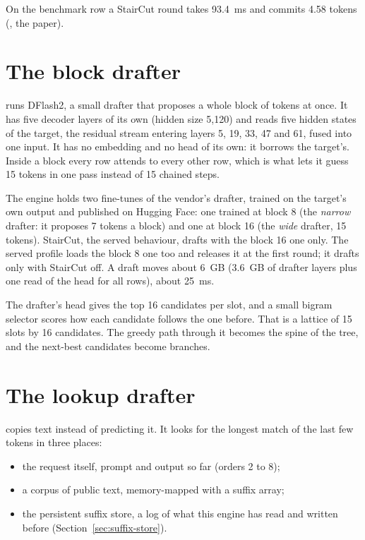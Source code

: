 On the benchmark row a StairCut round takes 93.4~ms and commits 4.58 tokens (\measured, the paper).

\section{The block drafter}

 runs DFlash2, a small drafter that proposes a whole block of tokens at once. It has five decoder layers of its own (hidden size 5,120) and reads five hidden states of the target, the residual stream entering layers 5, 19, 33, 47 and 61, fused into one input. It has no embedding and no head of its own: it borrows the target's. Inside a block every row attends to every other row, which is what lets it guess 15 tokens in one pass instead of 15 chained steps.

The engine holds two fine-tunes of the vendor's drafter, trained on the target's own output and published on Hugging Face: one trained at block 8 (the \emph{narrow} drafter: it proposes 7 tokens a block) and one at block 16 (the \emph{wide} drafter, 15 tokens). StairCut, the served behaviour, drafts with the block 16 one only. The served profile loads the block 8 one too and releases it at the first round; it drafts only with StairCut off. A draft moves about 6~GB (3.6~GB of drafter layers plus one read of the head for all rows), about 25~ms.

The drafter's head gives the top 16 candidates per slot, and a small bigram selector scores how each candidate follows the one before. That is a lattice of 15 slots by 16 candidates. The greedy path through it becomes the spine of the tree, and the next-best candidates become branches.

\section{The lookup drafter}

 copies text instead of predicting it. It looks for the longest match of the last few tokens in three places:

\begin{itemize}
\item the request itself, prompt and output so far (orders 2 to 8);
\item a corpus of public text, memory-mapped with a suffix array;
\item the persistent suffix store, a log of what this engine has read and written before (Section~\ref{sec:suffix-store}).
\end{itemize}

